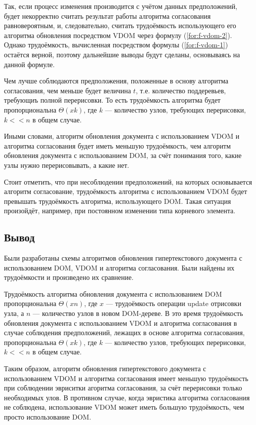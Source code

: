 Так, если процесс изменения производится с учётом данных предположений, будет некорректно считать результат работы алгоритма согласования равновероятным, и, следовательно, считать трудоёмкость использующего его алгоритма обновления посредством VDOM через формулу (\ref{for:f-vdom-2}). 
Однако трудоёмкость, вычисленная посредством формулы (\ref{for:f-vdom-1}) остаётся верной, поэтому дальнейшие выводы будут сделаны, основываясь на данной формуле.

Чем лучше соблюдаются предположения, положенные в основу алгоритма согласования, чем меньше будет величина $t$, т.е. количество поддеревьев, требующиъ полной перерисовки. 
То есть трудоёмкость алгоритма будет пропорциональна $\Theta(xk)$, где $k$ --- количество узлов, требующих перерисовки, $k << n$ в общем случае.

Иными словами, алгоритм обновления документа с использованием VDOM и алгоритма согласования будет иметь меньшую трудоёмкость, чем алгоритм обновления документа с использованием DOM, за счёт понимания того, какие узлы нужно перерисовывать, а какие нет.

Стоит отметить, что при несоблюдении предположений, на которых основывается алгоритм согласование, трудоёмкость алгоритма с использованием VDOM будет превышать трудоёмкость алгоритма, использующего DOM. 
Такая ситуация произойдёт, например, при постоянном изменении типа корневого элемента.

\subsection*{Вывод}

Были разработаны схемы алгоритмов обновления гипертекстового документа с использованием DOM, VDOM и алгоритма согласования. Были найдены их трудоёмкости и произведено их сравнение.

Трудоёмкость алгоритма обновления документа с использованием DOM пропорциональна $\Theta(xn)$, где $x$ --- трудоёмкость операции update отрисовки узла, а $n$ --- количество узлов в новом DOM-дереве.
В это время трудоёмкость обновления документа с использованием VDOM и алгоритма согласования в случае соблюдения предположений, лежащих в основе алгоритма согласования, пропорциональна $\Theta(xk)$, где $k$ --- количество узлов, требующих перерисовки, $k << n$ в общем случае.

Таким образом, алгоритм обновления гипертекстового документа с использованием VDOM и алгоритма согласования имеет меньшую трудоёмкость при соблюдении эвриситки агоритма согласования, за счёт перерисовки только необходимых улов.
В противном случае, когда эвристика алгоритма согласования не соблюдена, использование VDOM может иметь большую трудоёмкость, чем просто использование DOM.

\pagebreak
